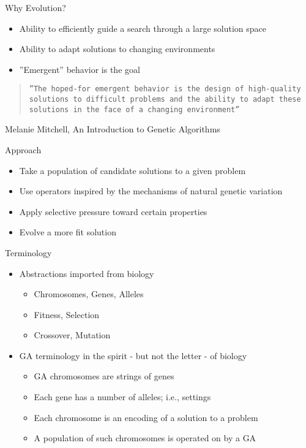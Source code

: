 \documentclass[%
pdf,
colorBG,
slideColor,
tcrico,
]{prosper}
\begin{document}
\begin{slide}{Why Evolution?}
\begin{itemize}
\item Ability to efficiently guide a search through a large solution space
\item Ability to adapt solutions to changing environments
\item ''Emergent'' behavior is the goal
\end{itemize}
\begin{quote}
\texttt{''The hoped-for emergent behavior is the design of high-quality solutions to difficult problems and the ability to adapt these solutions in the face of a changing environment'' 
}\end{quote}
Melanie Mitchell, An Introduction to Genetic Algorithms
\end{slide}


\begin{slide}{ Approach}  
\begin{itemize}
\item Take a population of candidate solutions to a given problem
\item Use operators inspired by the mechanisms of natural genetic variation
\item Apply selective pressure toward certain properties
\item Evolve a more fit solution 
\end{itemize}

\end{slide}


\begin{slide}{ Terminology  }  
\tiny
\begin{itemize}
\item Abstractions imported from biology
	\begin{itemize}
	\item Chromosomes, Genes, Alleles
	\item Fitness, Selection
	\item Crossover, Mutation
	\end{itemize}
\item GA terminology in the spirit - but not the letter - of  biology
\begin{itemize}
\item GA chromosomes are strings of genes
\item Each gene has a number of alleles; i.e., settings
\item Each chromosome is an encoding of a solution to a problem
\item A population of such chromosomes is operated on by a GA
\end{itemize}
\end{itemize}

\end{slide}
\end{document}
